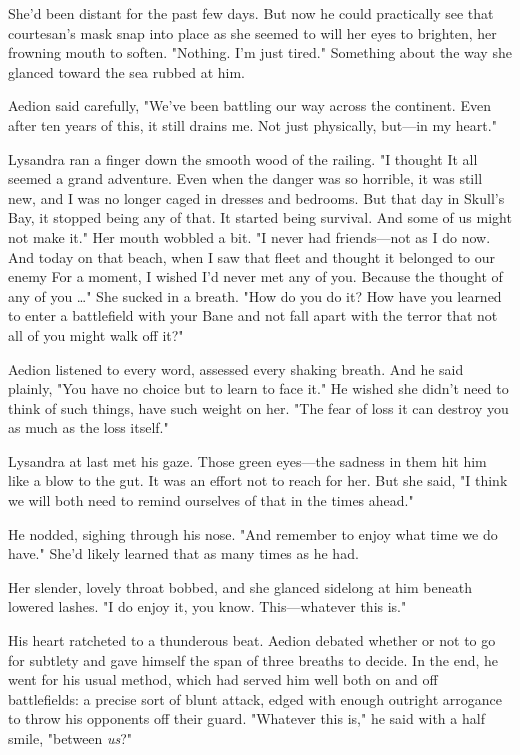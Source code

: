 She'd been distant for the past few days. But now he could practically see that courtesan's mask snap into place as she seemed to will her eyes to brighten, her frowning mouth to soften. "Nothing. I'm just tired." Something about the way she glanced toward the sea rubbed at him.

Aedion said carefully, "We've been battling our way across the continent. Even after ten years of this, it still drains me. Not just physically, but---in my heart."

Lysandra ran a finger down the smooth wood of the railing. "I thought
 It all seemed a grand adventure. Even when the danger was so horrible, it was still new, and I was no longer caged in dresses and bedrooms. But that day in Skull's Bay, it stopped being any of that. It started being  survival. And some of us might not make it." Her mouth wobbled a bit. "I never had friends---not as I do now. And today on that beach, when I saw that fleet and thought it belonged to our enemy  For a moment, I wished I'd never met any of you. Because the thought of any of you \ldots" She sucked in a breath. "How do you do it? How have you learned to enter a battlefield with your Bane and not fall apart with the terror that not all of you might walk off it?"

Aedion listened to every word, assessed every shaking breath. And he said plainly, "You have no choice but to learn to face it." He wished she didn't need to think of such things, have such weight on her. "The fear of loss  it can destroy you as much as the loss itself."

Lysandra at last met his gaze. Those green eyes---the sadness in them hit him like a blow to the gut. It was an effort not to reach for her. But she said, "I think we will both need to remind ourselves of that in the times ahead."

He nodded, sighing through his nose. "And remember to enjoy what time we do have." She'd likely learned that as many times as he had.

Her slender, lovely throat bobbed, and she glanced sidelong at him beneath lowered lashes. "I do enjoy it, you know. This---whatever this is."

His heart ratcheted to a thunderous beat. Aedion debated whether or not to go for subtlety and gave himself the span of three breaths to decide. In the end, he went for his usual method, which had served him well both on and off battlefields: a precise sort of blunt attack, edged with enough outright arrogance to throw his opponents off their guard. "Whatever this is," he said with a half smile, "between \emph{us}?"

